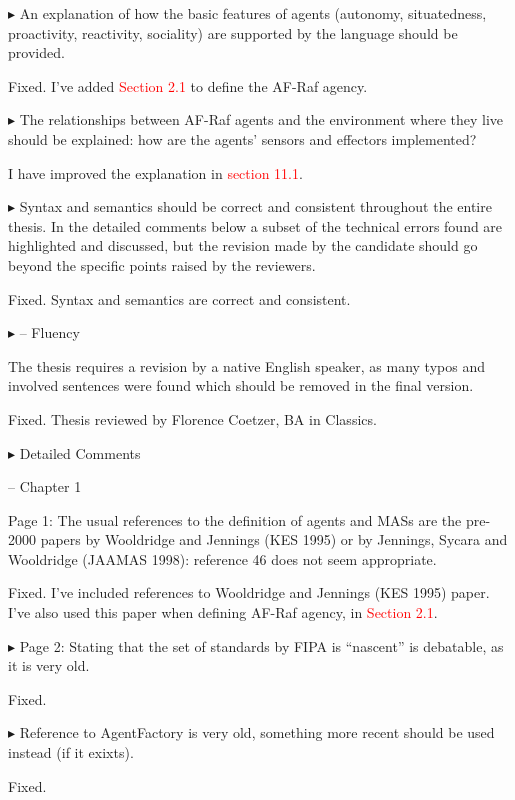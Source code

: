 \documentclass{article}
\newcommand*\R[1]{\textcolor{red}{#1}} %
\newenvironment{them}%
  {\bigskip\noindent\begingroup\color{blue}$\blacktriangleright$\enspace}%
  {\endgroup\par}
\begin{document}
\begin{them}
An explanation of how the basic features of agents (autonomy, situatedness,
proactivity, reactivity, sociality) are supported by the language should be
provided. 
\end{them}
Fixed. I've added \R{Section 2.1} to define the AF-Raf agency.

\begin{them}
The relationships between AF-Raf agents and the environment where
they live should be explained: how are the agents' sensors and effectors
implemented? 
\end{them}
I have improved the explanation in \R{section 11.1}.

\begin{them}
Syntax and semantics should be correct and consistent throughout the entire
thesis. In the detailed comments below a subset of the technical errors found
are highlighted and discussed, but the revision made by the candidate should go
beyond the specific points raised by the reviewers.
\end{them}
Fixed. Syntax and semantics are correct and consistent.

\begin{them}
-- Fluency

The thesis requires a revision by a native English speaker, as many typos and
involved sentences were found which should be removed in the final version.
\end{them}
Fixed. Thesis reviewed by Florence Coetzer, BA in Classics.

\begin{them}
Detailed Comments

-- Chapter 1

Page 1:
The usual references to the definition of agents and MASs are the pre-2000
papers by Wooldridge and Jennings (KES 1995) or by Jennings, Sycara and
Wooldridge (JAAMAS 1998): reference 46 does not seem appropriate.
\end{them}
Fixed. I've included references to Wooldridge and Jennings (KES 1995) paper.
I've also used this paper when defining AF-Raf agency, in \R{Section 2.1}.

\begin{them}
Page 2:
Stating that the set of standards by FIPA is ``nascent'' is debatable, as it is
very old.
\end{them}
Fixed.

\begin{them}
Reference to AgentFactory is very old, something more recent should be used
instead (if it exixts).
\end{them}
Fixed.
\end{document}
